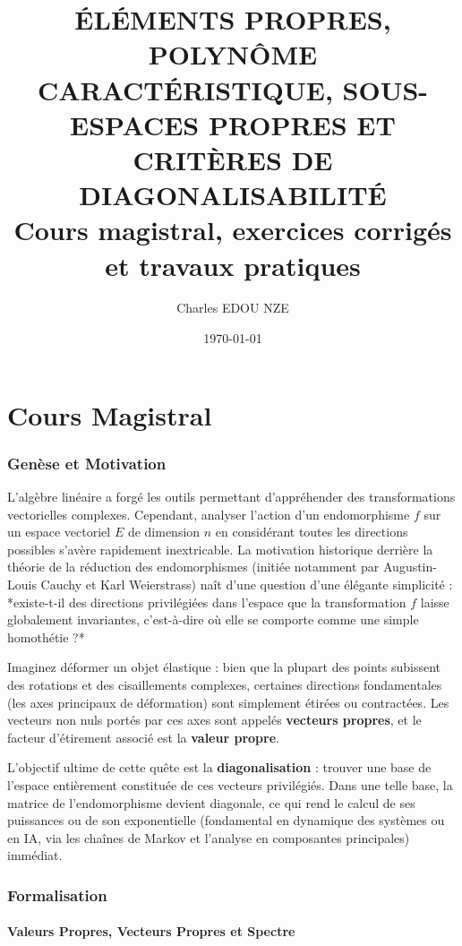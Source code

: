\documentclass[11pt,a4paper]{article}
\title{\Huge ÉLÉMENTS PROPRES, POLYNÔME CARACTÉRISTIQUE, SOUS-ESPACES PROPRES ET CRITÈRES DE DIAGONALISABILITÉ \\ \large Cours magistral, exercices corrigés et travaux pratiques}
\author{\Large Charles EDOU NZE}
\date{\today}
\begin{document}
\maketitle
\tableofcontents
\newpage

\part{Cours Magistral}

\section{Genèse et Motivation}

L'algèbre linéaire a forgé les outils permettant d'appréhender des transformations vectorielles complexes. Cependant, analyser l'action d'un endomorphisme $f$ sur un espace vectoriel $E$ de dimension $n$ en considérant toutes les directions possibles s'avère rapidement inextricable. La motivation historique derrière la théorie de la réduction des endomorphismes (initiée notamment par Augustin-Louis Cauchy et Karl Weierstrass) naît d'une question d'une élégante simplicité : *existe-t-il des directions privilégiées dans l'espace que la transformation $f$ laisse globalement invariantes, c'est-à-dire où elle se comporte comme une simple homothétie ?*

Imaginez déformer un objet élastique : bien que la plupart des points subissent des rotations et des cisaillements complexes, certaines directions fondamentales (les axes principaux de déformation) sont simplement étirées ou contractées. Les vecteurs non nuls portés par ces axes sont appelés \textbf{vecteurs propres}, et le facteur d'étirement associé est la \textbf{valeur propre}.

L'objectif ultime de cette quête est la \textbf{diagonalisation} : trouver une base de l'espace entièrement constituée de ces vecteurs privilégiés. Dans une telle base, la matrice de l'endomorphisme devient diagonale, ce qui rend le calcul de ses puissances ou de son exponentielle (fondamental en dynamique des systèmes ou en IA, via les chaînes de Markov et l'analyse en composantes principales) immédiat.

\section{Formalisation}

\subsection{Valeurs Propres, Vecteurs Propres et Spectre}
\end{document}
